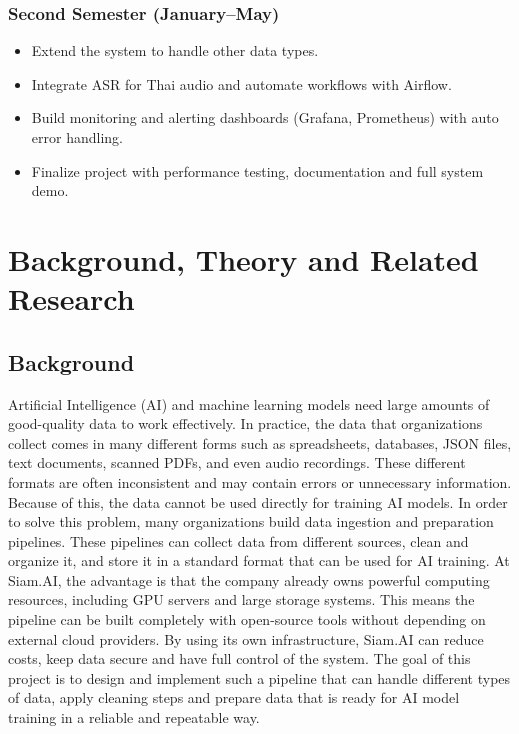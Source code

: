 \documentclass[12pt,oneside,openright,a4paper]{cpe-english-project}
\begin{document}
\subsection{Second Semester (January--May)}
\begin{itemize}
\item Extend the system to handle other data types.
\item Integrate ASR for Thai audio and automate workflows with Airflow.
\item Build monitoring and alerting dashboards (Grafana, Prometheus) with auto error handling.
\item Finalize project with performance testing, documentation and full system demo.
\end{itemize}

\chapter{Background, Theory and Related Research}

\section{Background}

Artificial Intelligence (AI) and machine learning models need large amounts of good-quality data to work effectively. In practice, the data that organizations collect comes in many different forms such as spreadsheets, databases, JSON files, text documents, scanned PDFs, and even audio recordings. These different formats are often inconsistent and may contain errors or unnecessary information. Because of this, the data cannot be used directly for training AI models. In order to solve this problem, many organizations build data ingestion and preparation pipelines. These pipelines can collect data from different sources, clean and organize it, and store it in a standard format that can be used for AI training. At Siam.AI, the advantage is that the company already owns powerful computing resources, including GPU servers and large storage systems. This means the pipeline can be built completely with open-source tools without depending on external cloud providers. By using its own infrastructure, Siam.AI can reduce costs, keep data secure and have full control of the system. The goal of this project is to design and implement such a pipeline that can handle different types of data, apply cleaning steps and prepare data that is ready for AI model training in a reliable and repeatable way.
\end{document}
